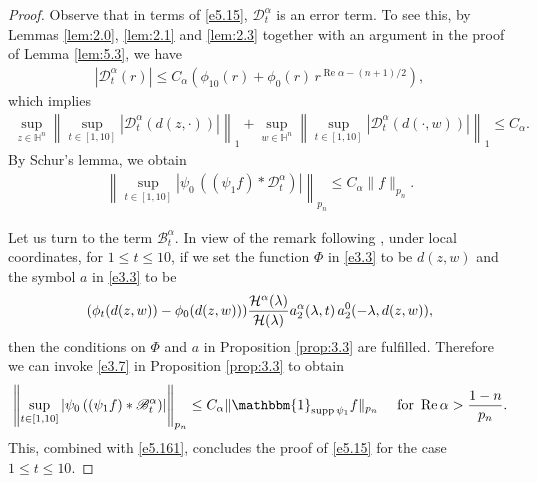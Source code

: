 \documentclass[11pt]{amsproc}
\newcommand{\indicator}{\mathbbm{1}}
\newcommand{\supp}{\mathop{\mathrm{supp}}}
\newcommand{\0}{\mathbf{0}}
\newcommand{\bc}{{ \mathcal{H} }}
\renewcommand{\Re}{\mathop{\mathrm{Re}}}
\renewcommand{\H}{\mathbb{H}}
\numberwithin{equation}{section}
\numberwithin{figure}{section}
\theoremstyle{definition}
\theoremstyle{remark}
\numberwithin{thm}{section}
\begin{document}
\begin{proof}
Observe  that in terms of \eqref{e5.15}, $\mathscr{D}^\alpha_t$
is an error term. To see this, by Lemmas \ref{lem:2.0}, \ref{lem:2.1} and \ref{lem:2.3} 
together with 
an argument in the proof of Lemma \ref{lem:5.3},  we have  
\begin{eqnarray}\label{e5.162}
|\mathscr{D}^\alpha_t(r)|\leq C_\alpha(\phi_{10}(r)+\phi_0(r)\,r^{\Re\alpha-(n+1)/2}),
\end{eqnarray}
which implies  
\begin{eqnarray*}
\sup_{z\in\H^n}\left\|\sup_{t\in[1,10]}|\mathscr{D}^\alpha_t(d(z,\cdot))|\right\|_1+\sup_{w\in\H^n}\left\|\sup_{t\in[1,10]}|\mathscr{D}^\alpha_t(d(\cdot,w))|\right\|_1\leq C_\alpha.
\end{eqnarray*}
By Schur's lemma,   we obtain 
\begin{eqnarray}\label{e5.161}
\left\|\sup_{t\in[1,10]}|\psi_0\,((\psi_1f)* \mathscr{D}^\alpha_t)|\right\|_{p_n}\leq C_\alpha\|f\|_{p_n}.
\end{eqnarray}


Let us turn to the term $\mathscr{B}^\alpha_t$.  In view of 
the remark following \cite[Corollary 2.2]{So2}, under local coordinates, for $1\leq t\leq 10$, if we set the function $\Phi$ in \eqref{e3.3} to be $d(z,w)$ and the symbol $a$ in \eqref{e3.3} to be
$$
(\phi_t(d(z,w))-\phi_0(d(z,w))){\bc^\alpha(\lambda)\over\bc(\lambda)}a^\alpha_2(\lambda,t)\,a^0_2(-\lambda,d(z,w)),
$$
then the conditions on $\Phi$ and $a$ in Proposition \ref{prop:3.3} are fulfilled. Therefore we can invoke \eqref{e3.7} in Proposition \ref{prop:3.3} to obtain
\begin{eqnarray*}
\left\|\sup_{t\in[1,10]}|\psi_0\,((\psi_1f)*\mathscr{B}^\alpha_t)|\right\|_{p_n}\leq C_\alpha\|\indicator_{\supp \psi_1}f\|_{p_n}\ \ \ \ \mbox{for }\Re\alpha>{1-n\over p_n}.
\end{eqnarray*}
This, combined with \eqref{e5.161}, concludes the proof of \eqref{e5.15} for the case $1\leq t\leq 10$.

\medskip


\end{proof}
\end{document}
